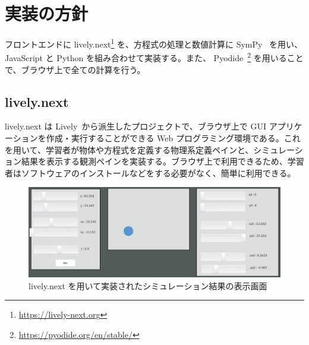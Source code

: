 \chapter{実装の方針} \label{implementation}

フロントエンドに lively.next\footnote{\url{https://lively-next.org}} を、方程式の処理と数値計算に SymPy~\cite{meurer_sympy_2017} を用い、JavaScript と Python を組み合わせて実装する。また、 Pyodide~\footnote{\url{https://pyodide.org/en/stable/}} を用いることで、ブラウザ上で全ての計算を行う。

\section{lively.next}
lively.next は Lively~\cite{ingalls_2008}から派生したプロジェクトで、ブラウザ上で GUI アプリケーションを作成・実行することができる Web プログラミング環境である。これを用いて、学習者が物体や方程式を定義する物理系定義ペインと、シミュレーション結果を表示する観測ペインを実装する。ブラウザ上で利用できるため、学習者はソフトウェアのインストールなどをする必要がなく、簡単に利用できる。

\begin{figure}[hbt]
\centering
\includegraphics[width=0.9\linewidth]{figure/lively_example.png}
\caption{lively.next を用いて実装されたシミュレーション結果の表示画面}
\end{figure}


